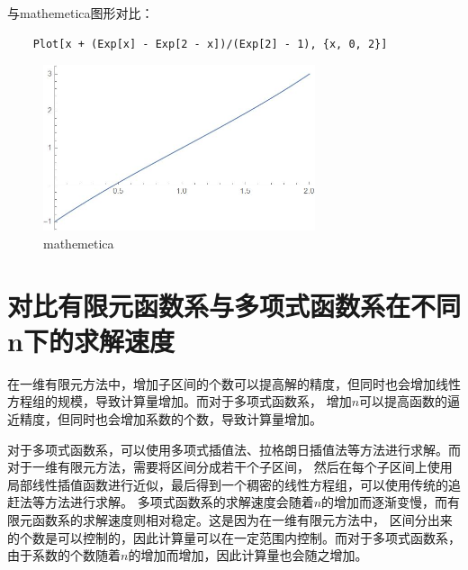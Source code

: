 \documentclass[12pt, a4paper, oneside]{ctexart}
\begin{document}
\begin{spacing}{2.0}
与mathemetica图形对比：
\begin{lstlisting}
    Plot[x + (Exp[x] - Exp[2 - x])/(Exp[2] - 1), {x, 0, 2}]
\end{lstlisting}
\begin{figure}[H]
    \centering
    \includegraphics[width=8cm]{mma.jpg}
    \caption{mathemetica}
\end{figure}


\section{对比有限元函数系与多项式函数系在不同n下的求解速度}

在一维有限元方法中，增加子区间的个数可以提高解的精度，但同时也会增加线性方程组的规模，导致计算量增加。而对于多项式函数系，
增加$n$可以提高函数的逼近精度，但同时也会增加系数的个数，导致计算量增加。

对于多项式函数系，可以使用多项式插值法、拉格朗日插值法等方法进行求解。而对于一维有限元方法，需要将区间分成若干个子区间，
然后在每个子区间上使用局部线性插值函数进行近似，最后得到一个稠密的线性方程组，可以使用传统的追赶法等方法进行求解。
多项式函数系的求解速度会随着$n$的增加而逐渐变慢，而有限元函数系的求解速度则相对稳定。这是因为在一维有限元方法中，
区间分出来的个数是可以控制的，因此计算量可以在一定范围内控制。而对于多项式函数系，由于系数的个数随着$n$的增加而增加，因此计算量也会随之增加。

\end{spacing}{}
\end{document}
